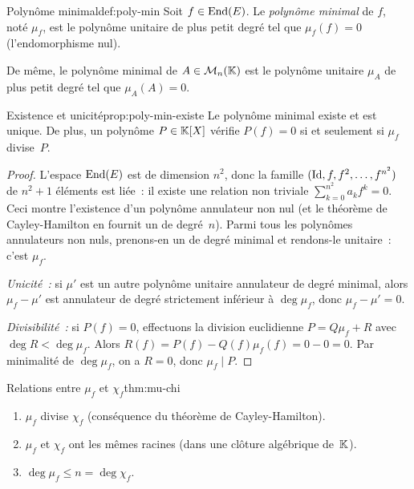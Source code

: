 \begin{definition}{Polynôme minimal}{def:poly-min}
  Soit $f\in\operatorname{End}(E)$. Le \emph{polynôme minimal} de $f$, noté
  $\mu_f$, est le polynôme unitaire de plus petit degré tel que
  $\mu_f(f)=0$ (l'endomorphisme nul).

  De même, le polynôme minimal de $A\in\mathcal{M}_n({\mathbb{K}})$ est le polynôme
  unitaire $\mu_A$ de plus petit degré tel que $\mu_A(A)=0$.
\end{definition}

\begin{proposition}{Existence et unicité}{prop:poly-min-existe}
  Le polynôme minimal existe et est unique. De plus, un polynôme
  $P\in{\mathbb{K}}[X]$ vérifie $P(f)=0$ si et seulement si $\mu_f$ divise~$P$.
\end{proposition}

\begin{proof}
  L'espace $\operatorname{End}(E)$ est de dimension $n^2$, donc la famille
  $(\operatorname{Id},f,f^2,\ldots,f^{n^2})$ de $n^2+1$ éléments est liée~: il
  existe une relation non triviale $\sum_{k=0}^{n^2}a_k f^k=0$. Ceci
  montre l'existence d'un polynôme annulateur non nul (et le théorème
  de Cayley-Hamilton en fournit un de degré~$n$). Parmi tous les
  polynômes annulateurs non nuls, prenons-en un de degré minimal et
  rendons-le unitaire~: c'est $\mu_f$.

  \emph{Unicité~:} si $\mu'$ est un autre polynôme unitaire annulateur
  de degré minimal, alors $\mu_f-\mu'$ est annulateur de degré
  strictement inférieur à $\deg\mu_f$, donc $\mu_f-\mu'=0$.

  \emph{Divisibilité~:} si $P(f)=0$, effectuons la division euclidienne
  $P=Q\mu_f+R$ avec $\deg R<\deg\mu_f$. Alors $R(f)=P(f)-Q(f)\mu_f(f)
  =0-0=0$. Par minimalité de $\deg\mu_f$, on a $R=0$, donc
  $\mu_f\mid P$.
\end{proof}

\begin{theorem}{Relations entre $\mu_f$ et $\chi_f$}{thm:mu-chi}
  \begin{enumerate}[label=(\roman*)]
    \item $\mu_f$ divise $\chi_f$ (conséquence du théorème de
      Cayley-Hamilton).
    \item $\mu_f$ et $\chi_f$ ont les mêmes racines (dans une clôture
      algébrique de~${\mathbb{K}}$).
    \item $\deg\mu_f\leq n=\deg\chi_f$.
  \end{enumerate}
\end{theorem}

